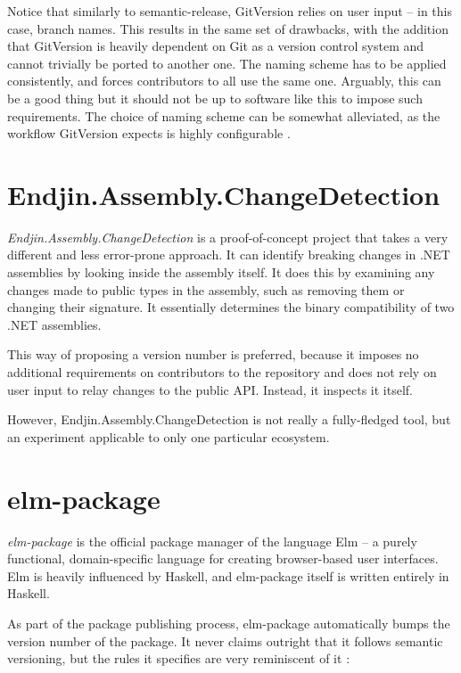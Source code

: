 \documentclass{l4proj}
\begin{document}
Notice that similarly to semantic-release, GitVersion relies on user
input -- in this case, branch names. This results in the same set of
drawbacks, with the addition that GitVersion is heavily dependent on
Git as a version control system and cannot trivially be ported to
another one. The naming scheme has to be applied consistently, and
forces contributors to all use the same one. Arguably, this can be a
good thing but it should not be up to software like this to impose
such requirements. The choice of naming scheme can be somewhat
alleviated, as the workflow GitVersion expects is highly configurable
\cite{GitVersionConfiguration}.

\section{Endjin.Assembly.ChangeDetection}

\textit{Endjin.Assembly.ChangeDetection} \cite{Endjin} is a
proof-of-concept project that takes a very different and less
error-prone approach. It can identify breaking changes in .NET
assemblies by looking inside the assembly itself. It does this
by examining any changes made to public types in the assembly, such as
removing them or changing their signature. It essentially determines
the binary compatibility of two .NET assemblies.

This way of proposing a version number is preferred, because it
imposes no additional requirements on contributors to the repository
and does not rely on user input to relay changes to the public API.
Instead, it inspects it itself.

However, Endjin.Assembly.ChangeDetection is not really a fully-fledged
tool, but an experiment applicable to only one particular ecosystem.

\section{elm-package}

\textit{elm-package} \cite{ElmPackage} is the official package manager
of the language Elm -- a purely functional, domain-specific
language for creating browser-based user interfaces. Elm is heavily
influenced by Haskell, and elm-package itself is written entirely in
Haskell.

As part of the package publishing process, elm-package automatically
bumps the version number of the package. It never claims outright that
it follows semantic versioning, but the rules it specifies are very
reminiscent of it \cite{ElmPackageVR}:
\end{document}
